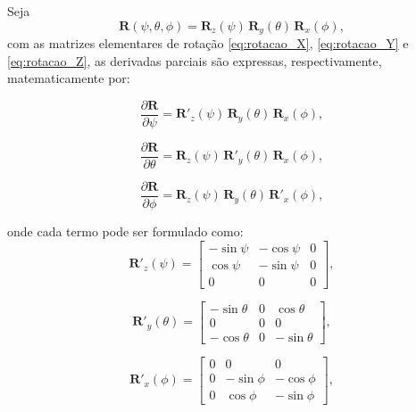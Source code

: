 Seja
\begin{equation}
\mathbf R(\psi,\theta,\phi)=\mathbf R_z(\psi)\,\mathbf R_y(\theta)\,\mathbf R_x(\phi),
\end{equation}
com as matrizes elementares de rotação
\eqref{eq:rotacao_X}, \eqref{eq:rotacao_Y} e \eqref{eq:rotacao_Z}, as derivadas parciais são expressas, respectivamente, matematicamente por:

\begin{equation}
    \label{eq:derivada_rz}
\frac{\partial \mathbf R}{\partial \psi}=\mathbf R'_z(\psi)\,\mathbf R_y(\theta)\,\mathbf R_x(\phi),
\end{equation}

\begin{equation}
    \label{eq:derivada_ry}
\frac{\partial \mathbf R}{\partial \theta}=\mathbf R_z(\psi)\,\mathbf R'_y(\theta)\,\mathbf R_x(\phi),
\end{equation}

\begin{equation}
\label{eq:derivada_rx}
\frac{\partial \mathbf R}{\partial \phi}=\mathbf R_z(\psi)\,\mathbf R_y(\theta)\,\mathbf R'_x(\phi),
\end{equation}

onde cada termo pode ser formulado como:
\begin{equation}
    \label{eq:matriz_derivada_rz}
\mathbf R'_z(\psi)=
\begin{bmatrix}
-\sin\psi & -\cos\psi & 0\\
 \cos\psi & -\sin\psi & 0\\
 0&0&0
\end{bmatrix},
\end{equation}

\begin{equation}
    \label{eq:matriz_derivada_ry}
\mathbf R'_y(\theta)=
\begin{bmatrix}
-\sin\theta&0&\cos\theta\\
0&0&0\\
-\cos\theta&0&-\sin\theta
\end{bmatrix},
\end{equation}

\begin{equation}
    \label{eq:matriz_derivada_rx}
\mathbf R'_x(\phi)=
\begin{bmatrix}
0&0&0\\
0&-\sin\phi&-\cos\phi\\
0&\cos\phi&-\sin\phi
\end{bmatrix},
\end{equation}


